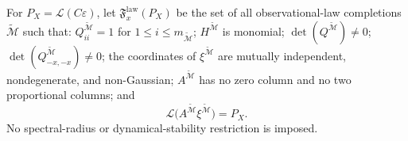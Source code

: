 For \(P_X=\mathcal L(C\varepsilon)\), let \(\mathfrak F_x^{\mathrm{law}}(P_X)\) be the set of all observational-law completions \(\widetilde{\mathcal M}\) such that: \(Q^{\widetilde{\mathcal M}}_{ii}=1\) for \(1\le i\le m_{\widetilde{\mathcal M}}\); \(H^{\widetilde{\mathcal M}}\) is monomial; \(\det(Q^{\widetilde{\mathcal M}})\ne0\); \(\det(Q^{\widetilde{\mathcal M}}_{-x,-x})\ne0\); the coordinates of \(\xi^{\widetilde{\mathcal M}}\) are mutually independent, nondegenerate, and non-Gaussian; \(A^{\widetilde{\mathcal M}}\) has no zero column and no two proportional columns; and
\[
 \mathcal L\bigl(A^{\widetilde{\mathcal M}}\xi^{\widetilde{\mathcal M}}\bigr)=P_X.
\]
No spectral-radius or dynamical-stability restriction is imposed.